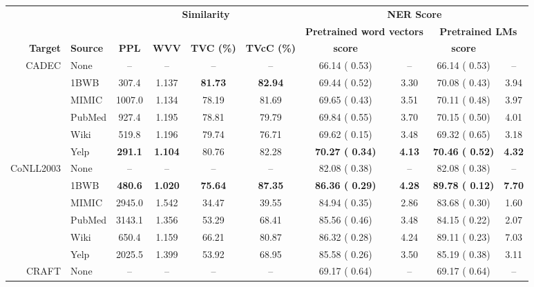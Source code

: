\documentclass[11pt,a4paper]{article}
\begin{document}
\begin{table*}[ht!]
\begin{small}
\begin{center}
\setlength{\tabcolsep}{4pt} \begin{tabular}{r l | c c c c | c c | c c }
\toprule
& & \multicolumn{4}{c}{\bf Similarity} & \multicolumn{4}{|c}{\bf NER  Score} \\ 
\cline{7-10}
& & \multicolumn{4}{c}{} & \multicolumn{2}{|c}{\bf Pretrained word vectors} & \multicolumn{2}{|c}{\bf Pretrained LMs} \\ 
\cline{3-6}\cline{7-10} \noalign{\vskip\arrayrulewidth} 
\bf Target & \bf Source & \bf PPL & \bf WVV & \bf TVC (\%) & \bf TVcC (\%) & \bf  score & \bf  & \bf  score & \bf  \\ \midrule
\multirow{6}{*}{CADEC} & None & -- & -- & -- & -- & 66.14 ( 0.53) & -- & 66.14 ( 0.53) & -- \\ 
 & 1BWB & \phantom{0}307.4 & 1.137 & \bf 81.73 & \bf 82.94 & 69.44 ( 0.52) & 3.30 & 70.08 ( 0.43) & 3.94 \\
 & MIMIC & 1007.0 & 1.134 & 78.19 & 81.69 & 69.65 ( 0.43) & 3.51 & 70.11 ( 0.48) & 3.97\\
 & PubMed & \phantom{0}927.4 & 1.195 & 78.81 & 79.79 & 69.84 ( 0.55) & 3.70 & 70.15 ( 0.50) & 4.01 \\
 & Wiki & \phantom{0}519.8 & 1.196 & 79.74 & 76.71 & 69.62 ( 0.15) & 3.48 & 69.32 ( 0.65) & 3.18 \\
 & Yelp & \bf \phantom{0}291.1 & \bf 1.104 & 80.76 & 82.28 & \bf 70.27 ( 0.34) & \bf 4.13 & \bf 70.46 ( 0.52) & \bf 4.32 \\ 
\midrule
\multirow{6}{*}{CoNLL2003} & None & -- & -- & -- & -- & 82.08 ( 0.38) & -- & 82.08 ( 0.38) & -- \\ 
 & 1BWB & \bf \phantom{0}480.6 & \bf 1.020 & \bf 75.64 & \bf 87.35 & \bf 86.36 ( 0.29) & \bf 4.28 & \bf 89.78 ( 0.12) & \bf 7.70 \\
 & MIMIC & 2945.0 & 1.542 & 34.47 & 39.55 & 84.94 ( 0.35) & 2.86 & 83.68 ( 0.30) & 1.60 \\
 & PubMed & 3143.1 & 1.356 & 53.29 & 68.41 & 85.56 ( 0.46) & 3.48 & 84.15 ( 0.22) & 2.07 \\
 & Wiki & \phantom{0}650.4 & 1.159 & 66.21 & 80.87 & 86.32 ( 0.28) & 4.24 & 89.11 ( 0.23) & 7.03 \\
 & Yelp & 2025.5 & 1.399 & 53.92 & 68.95 & 85.58 ( 0.26) & 3.50 & 85.19 ( 0.38) & 3.11 \\
\midrule
\multirow{6}{*}{CRAFT} & None & -- & -- & -- & -- & 69.17 ( 0.64) & -- & 69.17 ( 0.64) & -- \\ 

\end{tabular}
\end{center}
\end{small}
\end{table*}
\end{document}
